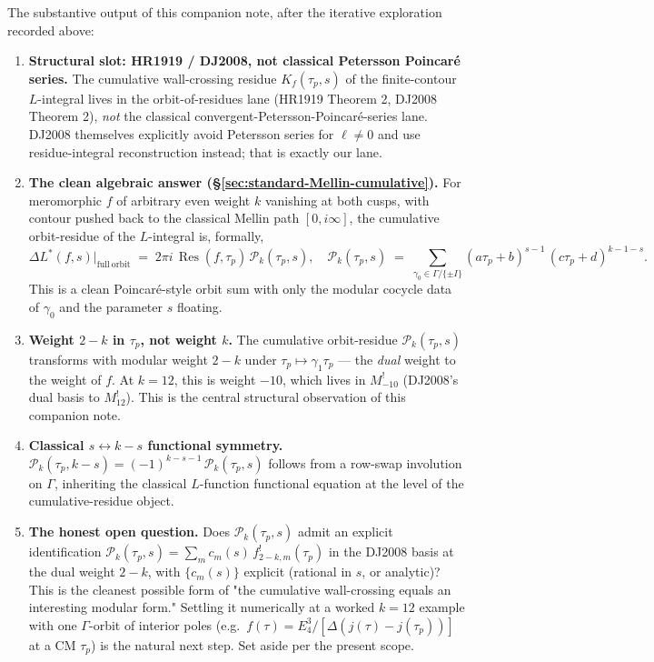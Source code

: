 \documentclass[11pt]{article}
\DeclareMathOperator{\Res}{Res}
\begin{document}
The substantive output of this companion note, after the iterative
exploration recorded above:

\begin{enumerate}\itemsep0.3em
\item \textbf{Structural slot: HR1919 / DJ2008, not classical
  Petersson Poincar\'e series.}  The cumulative wall-crossing
  residue $K_f(\tau_p, s)$ of the finite-contour $L$-integral lives
  in the orbit-of-residues lane (HR1919 Theorem 2, DJ2008 Theorem 2),
  \emph{not} the classical convergent-Petersson-Poincar\'e-series
  lane.  DJ2008 themselves explicitly avoid Petersson series for
  $\ell \neq 0$ and use residue-integral reconstruction instead;
  that is exactly our lane.

\item \textbf{The clean algebraic answer (\S\ref{sec:standard-Mellin-cumulative}).}
  For meromorphic $f$ of arbitrary even weight $k$ vanishing at both
  cusps, with contour pushed back to the classical Mellin path
  $[0, i\infty]$, the cumulative orbit-residue of the
  $L$-integral is, formally,
  \[
    \Delta L^*(f, s)\bigl|_{\mathrm{full\ orbit}}
    \;=\; 2\pi i\,\Res(f, \tau_p)\,\mathcal{P}_k(\tau_p, s),
    \quad
    \mathcal{P}_k(\tau_p, s) \;=\; \!\sum_{\gamma_0 \in \Gamma/\{\pm I\}}\!
    (a\tau_p + b)^{s - 1}\,(c\tau_p + d)^{k - 1 - s}.
  \]
  This is a clean Poincar\'e-style orbit sum with only the modular
  cocycle data of $\gamma_0$ and the parameter $s$ floating.

\item \textbf{Weight $2 - k$ in $\tau_p$, not weight $k$.}  The
  cumulative orbit-residue $\mathcal{P}_k(\tau_p, s)$ transforms with
  modular weight $2 - k$ under $\tau_p \mapsto \gamma_1\tau_p$ —
  the \emph{dual} weight to the weight of $f$.  At $k = 12$, this is
  weight $-10$, which lives in $M^!_{-10}$ (DJ2008's dual basis to
  $M^!_{12}$).  This is the central structural observation of this
  companion note.

\item \textbf{Classical $s \leftrightarrow k - s$ functional symmetry.}
  $\mathcal{P}_k(\tau_p, k - s) = (-1)^{k - s - 1}\,\mathcal{P}_k(\tau_p, s)$
  follows from a row-swap involution on $\Gamma$, inheriting the
  classical $L$-function functional equation at the level of the
  cumulative-residue object.

\item \textbf{The honest open question.}  Does $\mathcal{P}_k(\tau_p, s)$
  admit an explicit identification
  $\mathcal{P}_k(\tau_p, s) = \sum_m c_m(s)\,f^!_{2 - k, m}(\tau_p)$ in
  the DJ2008 basis at the dual weight $2 - k$, with $\{c_m(s)\}$
  explicit (rational in $s$, or analytic)?  This is the cleanest
  possible form of "the cumulative wall-crossing equals an
  interesting modular form."  Settling it numerically at a worked
  $k = 12$ example with one $\Gamma$-orbit of interior poles (e.g.\
  $f(\tau) = E_4^3/[\Delta(j(\tau) - j(\tau_p))]$ at a CM
  $\tau_p$) is the natural next step.  Set aside per the
  present scope.


\end{enumerate}
\end{document}
